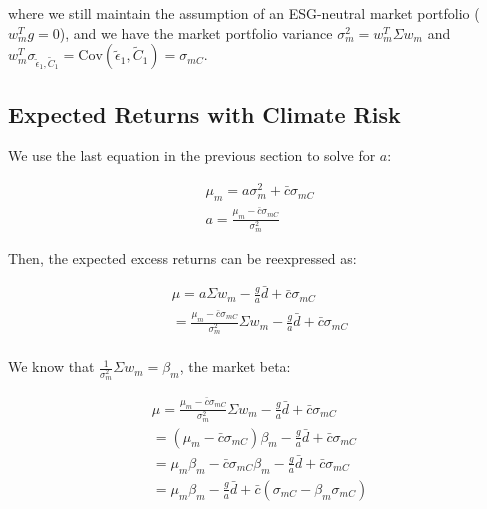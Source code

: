 where we still maintain the assumption of an ESG-neutral market portfolio ($w_m^Tg = 0$),
and we have the market portfolio variance 
$\sigma^2_m = w_m^T \Sigma w_m$ and 
$w_m^T \sigma_{\tilde{\epsilon}_1, \tilde{C}_1} = \text{Cov}(\tilde{\epsilon}_1, \tilde{C}_1) = \sigma_{mC}$.

\subsection{Expected Returns with Climate Risk}


We use the last equation in the previous section 
to solve for $a$:

\begin{equation}
    \begin{aligned}
        \mu_m = a \sigma^2_m + \bar{c} \sigma_{mC} \\
        a = \frac{\mu_m - \bar{c} \sigma_{mC}}{\sigma^2_m}
    \end{aligned}
\end{equation}

Then, the expected excess returns can be reexpressed as:

\begin{equation}
    \begin{aligned}
        \mu = a\Sigma w_m - \frac{g}{a} \bar{d} + \bar{c} \sigma_{mC} \\
        = \frac{\mu_m - \bar{c} \sigma_{mC}}{\sigma^2_m} \Sigma w_m - \frac{g}{a} \bar{d} + \bar{c} \sigma_{mC} \\
    \end{aligned}
\end{equation}

We know that $\frac{1}{\sigma^2_m}\Sigma w_m = \beta_m$, 
the market beta:

\begin{equation}
    \begin{aligned}
        \mu =  \frac{\mu_m - \bar{c} \sigma_{mC}}{\sigma^2_m} \Sigma w_m - \frac{g}{a} \bar{d} + \bar{c} \sigma_{mC} \\
        = (\mu_m - \bar{c} \sigma_{mC})\beta_m - \frac{g}{a} \bar{d} + \bar{c} \sigma_{mC}\\
        = \mu_m \beta_m - \bar{c} \sigma_{mC} \beta_m - \frac{g}{a} \bar{d} + \bar{c} \sigma_{mC} \\
        = \mu_m \beta_m - \frac{g}{a} \bar{d} + \bar{c}(\sigma_{mC} - \beta_m \sigma_{mC})
    \end{aligned}
\end{equation}


